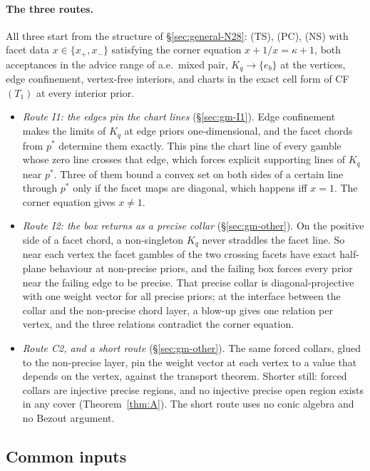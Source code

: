 \documentclass[11pt]{article}
\theoremstyle{definition}
\theoremstyle{remark}
\begin{document}
\paragraph{The three routes.} All three start from the structure of \S\ref{sec:general-N28}: (TS), (PC), (NS) with facet data $x\in\{x_+,x_-\}$ satisfying the corner equation $x+1/x=\kappa+1$, both acceptances in the advice range of a.e.\ mixed pair, $K_q\to\{e_b\}$ at the vertices, edge confinement, vertex-free interiors, and charts in the exact cell form of CF$(T_1)$ at every interior prior.
\begin{itemize}[leftmargin=*]
\item \emph{Route I1: the edges pin the chart lines} (\S\ref{sec:gm-I1}). Edge confinement makes the limits of $K_q$ at edge priors one-dimensional, and the facet chords from $p^*$ determine them exactly. This pins the chart line of every gamble whose zero line crosses that edge, which forces explicit supporting lines of $K_q$ near $p^*$. Three of them bound a convex set on both sides of a certain line through $p^*$ only if the facet maps are diagonal, which happens iff $x=1$. The corner equation gives $x\ne1$.
\item \emph{Route I2: the box returns as a precise collar} (\S\ref{sec:gm-other}). On the positive side of a facet chord, a non-singleton $K_q$ never straddles the facet line. So near each vertex the facet gambles of the two crossing facets have exact half-plane behaviour at non-precise priors, and the failing box forces every prior near the failing edge to be precise. That precise collar is diagonal-projective with one weight vector for all precise priors; at the interface between the collar and the non-precise chord layer, a blow-up gives one relation per vertex, and the three relations contradict the corner equation.
\item \emph{Route C2, and a short route} (\S\ref{sec:gm-other}). The same forced collars, glued to the non-precise layer, pin the weight vector at each vertex to a value that depends on the vertex, against the transport theorem. Shorter still: forced collars are injective precise regions, and no injective precise open region exists in any cover (Theorem~\ref{thm:A}). The short route uses no conic algebra and no Bezout argument.
\end{itemize}

\subsection{Common inputs}\label{sec:gm-inputs}
\end{document}
